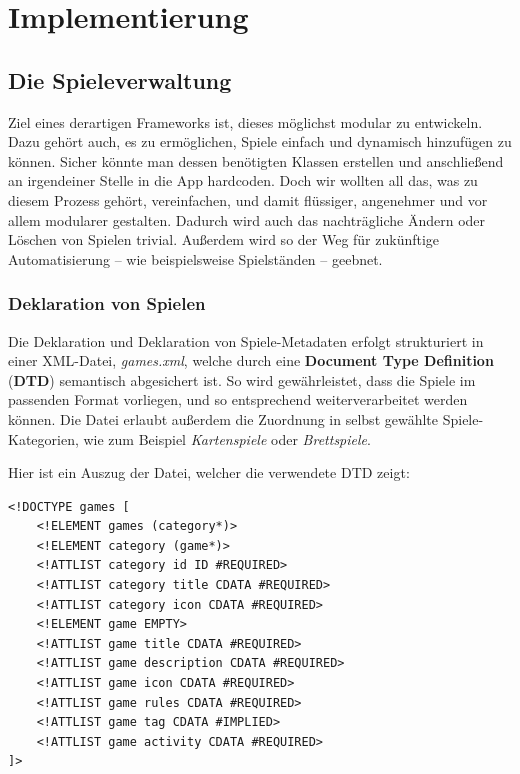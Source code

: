 \chapter{Implementierung}

\section{Die Spieleverwaltung}
\sectionauthor{\frank}

Ziel eines derartigen Frameworks ist, dieses möglichst modular  zu entwickeln. Dazu gehört auch, es zu ermöglichen, Spiele einfach
und dynamisch hinzufügen zu können. Sicher könnte man dessen benötigten Klassen
erstellen und anschließend an irgendeiner Stelle in die App hardcoden. Doch wir
wollten all das, was zu diesem Prozess gehört, vereinfachen, und damit flüssiger,
angenehmer und vor allem modularer gestalten. Dadurch wird auch das
nachträgliche Ändern oder Löschen von Spielen trivial. Außerdem wird so der Weg
für zukünftige Automatisierung -- wie beispielsweise Spielständen -- geebnet.

\subsection{Deklaration von Spielen}

Die Deklaration und Deklaration von Spiele-Metadaten erfolgt strukturiert in
einer XML-Datei, \emph{games.xml}, welche durch eine \textbf{Document Type
Definition} (\textbf{DTD}) semantisch abgesichert ist. So wird gewährleistet,
dass die Spiele im passenden Format vorliegen, und so entsprechend
weiterverarbeitet werden können. Die Datei erlaubt außerdem die Zuordnung in
selbst gewählte Spiele-Kategorien, wie zum Beispiel \emph{Kartenspiele} oder
\emph{Brettspiele}.

Hier ist ein Auszug der Datei, welcher die verwendete DTD zeigt:

\begin{lstlisting}
<!DOCTYPE games [
    <!ELEMENT games (category*)>
    <!ELEMENT category (game*)>
    <!ATTLIST category id ID #REQUIRED>
    <!ATTLIST category title CDATA #REQUIRED>
    <!ATTLIST category icon CDATA #REQUIRED>
    <!ELEMENT game EMPTY>
    <!ATTLIST game title CDATA #REQUIRED>
    <!ATTLIST game description CDATA #REQUIRED>
    <!ATTLIST game icon CDATA #REQUIRED>
    <!ATTLIST game rules CDATA #REQUIRED>
    <!ATTLIST game tag CDATA #IMPLIED>
    <!ATTLIST game activity CDATA #REQUIRED>
]>
\end{lstlisting}

